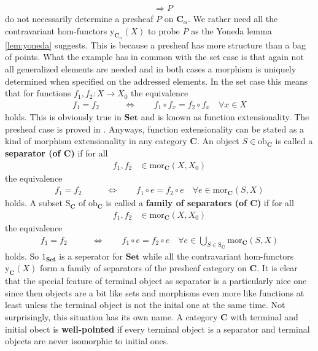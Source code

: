 \begin{exa}
\begin{enumerate}
\begin{align*}
  &\Rightarrow
  P
\end{align*}
do not necessarily determine a presheaf $P$ on $\mathbf{C}_{\alpha}$. We rather need all the contravariant hom-functors $\mathrm{y}_{\mathbf{C}_{\alpha}}(X)$ to probe $P$ as the Yoneda lemma \ref{lem:yoneda} suggests. This is because a presheaf has more structure than a bag of points. What the example has in common with the set case is that again not all generalized elements are needed and in both cases a morphism is uniquely determined when specified on the addressed elements. In the set case this means that for functions $f_{1},f_{2} \colon X \rightarrow X_{0}$ the equivalence
\begin{align*}
  f_{1}
  =
  f_{2}
  \qquad
  &\Leftrightarrow
  \qquad
  f_{1}
  \circ
  f_{x}
  =
  f_{2}
  \circ
  f_{x}
  \quad
  \forall
  x
  \in
  X
\end{align*}
holds. This is obviously true in $\mathbf{Set}$ and is known as function extensionality. The presheaf case is proved in \cite{c55c71e8}. Anyways, function extensionality can be stated as a kind of morphism extensionality in any category $\mathbf{C}$. An object $S \in \mathrm{ob}_{\mathbf{C}}$ is called a \textbf{separator (of $\mathbf{C}$)} if for all
\begin{align*}
  f_{1},
  f_{2}
  &\in
  \mathrm{mor}_{\mathbf{C}}(X,X_{0})
\end{align*}
the equivalence
\begin{align*}
  f_{1}
  =
  f_{2}
  \qquad
  &\Leftrightarrow
  \qquad
  f_{1}
  \circ
  e
  =
  f_{2}
  \circ
  e
  \quad
  \forall
  e
  \in
  \mathrm{mor}_{\mathbf{C}}(S,X)
\end{align*}
holds. A subset $\mathrm{S}_{\mathbf{C}}$ of $\mathrm{ob}_{\mathbf{C}}$ is called a \textbf{family of separators (of $\mathbf{C}$)} if for all
\begin{align*}
  f_{1},
  f_{2}
  &\in
  \mathrm{mor}_{\mathbf{C}}(X,X_{0})
\end{align*}
the equivalence
\begin{align*}
  f_{1}
  =
  f_{2}
  \qquad
  &\Leftrightarrow
  \qquad
  f_{1}
  \circ
  e
  =
  f_{2}
  \circ
  e
  \quad
  \forall
  e
  \in
  \bigcup_{S \in \mathrm{S}_{\mathbf{C}}}
  \mathrm{mor}_{\mathbf{C}}(S,X)
\end{align*}
holds. So $1_{\mathbf{Set}}$ is a seperator for $\mathbf{Set}$ while all the contravariant hom-functors $\mathrm{y}_{\mathbf{C}}(X)$ form a family of separators of the presheaf category on $\mathbf{C}$. It is clear that the special feature of terminal object as separator is a particularly nice one since then objects are a bit like sets and morphisms even more like functions at least unless the terminal object is not the inital one at the same time. Not surprisingly, this situation has its own name. A category $\mathbf{C}$ with terminal and initial obect is \textbf{well-pointed} if every terminal object is a separator and terminal objects are never isomorphic to initial ones.

\end{enumerate}
\end{exa}
